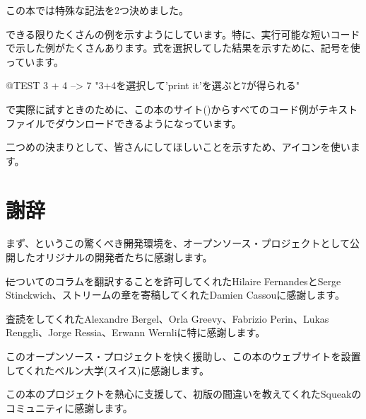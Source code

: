 \documentclass[a4paper,10pt,twoside]{book}
\begin{document}
この本では特殊な記法を2つ決めました。

できる限りたくさんの例を示すようにしています。特に、実行可能な短いコードで示した例がたくさんあります。式を選択してした結果を示すために、\ct{-->}記号を使っています。

\begin{code}{@TEST}
3 + 4 --> 7    "3+4を選択して'print it'を選ぶと7が得られる"
\end{code}

\pharo で実際に試すときのために、この本のサイト(\pbe)からすべてのコード例がテキストファイルでダウンロードできるようになっています。

二つめの決まりとして、皆さんにしてほしいことを示すため、\dothisicon{}アイコンを使います。


\section*{謝辞}

まず、\squeak というこの驚くべき\st 開発環境を、オープンソース・プロジェクトとして公開したオリジナルの開発者たちに感謝します。

\st についてのコラムを翻訳することを許可してくれたHilaire FernandesとSerge Stinckwich、ストリームの章を寄稿してくれたDamien Cassouに感謝します。

査読をしてくれたAlexandre Bergel、Orla Greevy、Fabrizio Perin、Lukas Renggli、Jorge Ressia、Erwann Wernliに特に感謝します。

このオープンソース・プロジェクトを快く援助し、この本のウェブサイトを設置してくれたベルン大学(スイス)に感謝します。

この本のプロジェクトを熱心に支援して、初版の間違いを教えてくれたSqueakのコミュニティに感謝します。

\ifx\wholebook\relax\else
   
   
\end{document}
